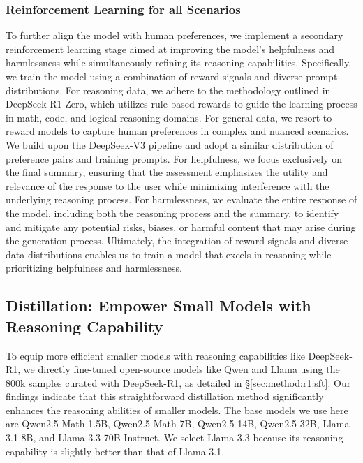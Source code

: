 \documentclass[11pt, a4paper, logo, copyright, nonumbering]{deepseek}
\newcommand{\dsro}{DeepSeek-R1-Zero}
\begin{document}
{\subsubsection{Reinforcement Learning for all Scenarios}

To further align the model with human preferences, we implement a secondary reinforcement learning stage aimed at improving the model's helpfulness and harmlessness while simultaneously refining its reasoning capabilities. Specifically, we train the model using a combination of reward signals and diverse prompt distributions.
For reasoning data, we adhere to the methodology outlined in \dsro, which utilizes rule-based rewards to guide the learning process in math, code, and logical reasoning domains. 
For general data, we resort to reward models to capture human preferences in complex and nuanced scenarios. We build upon the DeepSeek-V3 pipeline and adopt a similar distribution of preference pairs and training prompts. For helpfulness, we focus exclusively on the final summary, ensuring that the assessment emphasizes the utility and relevance of the response to the user while minimizing interference with the underlying reasoning process. For harmlessness, we evaluate the entire response of the model, including both the reasoning process and the summary, to identify and mitigate any potential risks, biases, or harmful content that may arise during the generation process. 
Ultimately, the integration of reward signals and diverse data distributions enables us to train a model that excels in reasoning while prioritizing helpfulness and harmlessness.


\subsection{Distillation: Empower Small Models with Reasoning Capability }

To equip more efficient smaller models with reasoning capabilities like DeepSeek-R1, we directly fine-tuned open-source models like Qwen \citep{qwen2_5} and Llama \citep{llama3_1_405b} using the 800k samples curated with DeepSeek-R1, as detailed in \S \ref{sec:method:r1:sft}.
Our findings indicate that this straightforward distillation method significantly enhances the reasoning abilities of smaller models.
The base models we use here are Qwen2.5-Math-1.5B, Qwen2.5-Math-7B, Qwen2.5-14B, Qwen2.5-32B, Llama-3.1-8B, and Llama-3.3-70B-Instruct. We select Llama-3.3 because its reasoning capability is slightly better than that of Llama-3.1.

}
\end{document}
